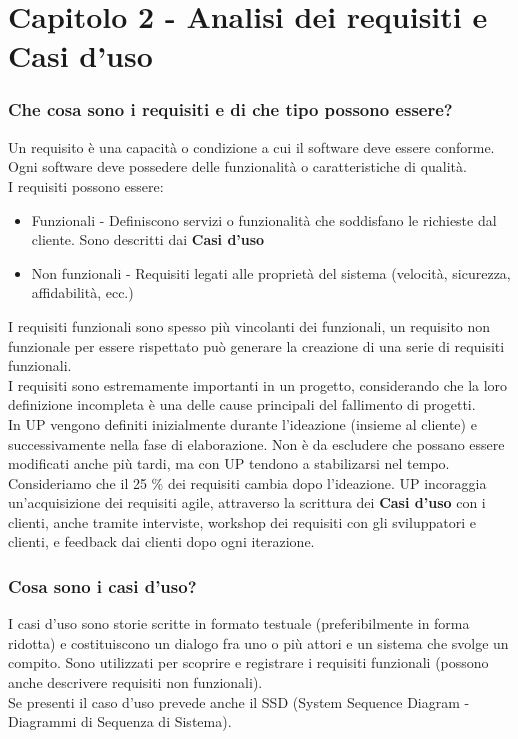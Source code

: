 \documentclass[12pt, a4paper, openany]{book}
\begin{document}
\chapter{Capitolo 2 - Analisi dei requisiti e Casi d'uso}
\subsection*{Che cosa sono i requisiti e di che tipo possono essere?}
Un requisito è una capacità o condizione a cui il software deve essere conforme. Ogni software
deve possedere delle funzionalità o caratteristiche di qualità.\\
I requisiti possono essere:
\begin{itemize}
    \item Funzionali - Definiscono servizi o funzionalità che soddisfano le richieste dal cliente. Sono
    descritti dai \textbf{Casi d'uso}
    \item Non funzionali - Requisiti legati alle proprietà  del sistema (velocità, sicurezza, affidabilità, ecc.)
\end{itemize}
I requisiti funzionali sono spesso più vincolanti dei funzionali, un requisito non funzionale per
essere rispettato può generare la creazione di una serie di requisiti funzionali.\\
I requisiti sono estremamente importanti in un progetto, considerando che la loro
definizione incompleta è una delle cause principali del fallimento di progetti.\\
In UP vengono definiti inizialmente durante l'ideazione (insieme al cliente) e successivamente
nella fase di elaborazione. Non è da escludere che possano essere modificati anche più tardi,
ma con UP tendono a stabilizarsi nel tempo. Consideriamo che il 25 \% dei requisiti cambia dopo
l'ideazione. UP incoraggia un'acquisizione dei requisiti agile, attraverso la scrittura 
dei \textbf{Casi d'uso} con i clienti, anche tramite interviste, workshop dei requisiti con gli sviluppatori
e clienti, e feedback dai clienti dopo ogni iterazione.

\subsection*{Cosa sono i casi d'uso?}
I casi d'uso sono storie scritte in formato testuale (preferibilmente in forma ridotta)
e costituiscono un dialogo fra uno o più attori e un sistema che svolge un compito. Sono
utilizzati per scoprire e registrare i requisiti funzionali (possono anche descrivere requisiti
non funzionali).\\
Se presenti il caso d'uso prevede anche il SSD (System Sequence Diagram - Diagrammi di Sequenza di Sistema).
\end{document}
